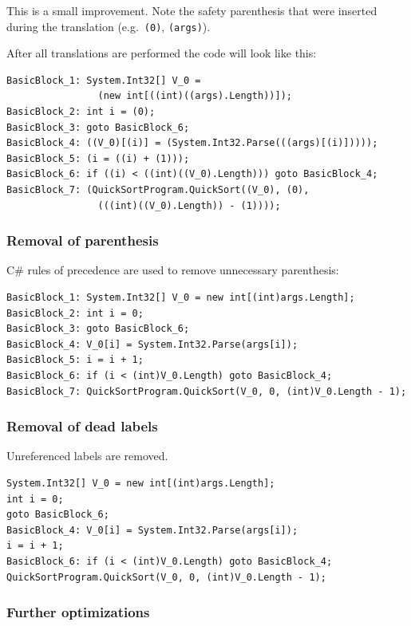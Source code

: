 \documentclass[12pt,twoside,notitlepage]{report}
\begin{document}
This is a small improvement.  Note the safety
parenthesis that were inserted during the translation
(e.g.\ \verb|(0)|, \verb|(args)|).

After all translations are performed the code will look like this:

\begin{verbatim}
BasicBlock_1: System.Int32[] V_0 =
                (new int[((int)((args).Length))]);
BasicBlock_2: int i = (0);
BasicBlock_3: goto BasicBlock_6;
BasicBlock_4: ((V_0)[(i)] = (System.Int32.Parse(((args)[(i)]))));
BasicBlock_5: (i = ((i) + (1)));
BasicBlock_6: if ((i) < ((int)((V_0).Length))) goto BasicBlock_4; 
BasicBlock_7: (QuickSortProgram.QuickSort((V_0), (0), 
                (((int)((V_0).Length)) - (1))));
\end{verbatim}

\subsubsection{Removal of parenthesis}

C\# rules of precedence are used to remove unnecessary parenthesis:

\begin{verbatim}
BasicBlock_1: System.Int32[] V_0 = new int[(int)args.Length];
BasicBlock_2: int i = 0;
BasicBlock_3: goto BasicBlock_6;
BasicBlock_4: V_0[i] = System.Int32.Parse(args[i]);
BasicBlock_5: i = i + 1;
BasicBlock_6: if (i < (int)V_0.Length) goto BasicBlock_4; 
BasicBlock_7: QuickSortProgram.QuickSort(V_0, 0, (int)V_0.Length - 1);
\end{verbatim}

\subsubsection{Removal of dead labels}

Unreferenced labels are removed.

\begin{verbatim}
System.Int32[] V_0 = new int[(int)args.Length];
int i = 0;
goto BasicBlock_6;
BasicBlock_4: V_0[i] = System.Int32.Parse(args[i]);
i = i + 1;
BasicBlock_6: if (i < (int)V_0.Length) goto BasicBlock_4; 
QuickSortProgram.QuickSort(V_0, 0, (int)V_0.Length - 1);
\end{verbatim}

\subsubsection{Further optimizations}
\end{document}
